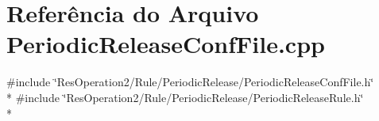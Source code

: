 \section{Referência do Arquivo Periodic\+Release\+Conf\+File.\+cpp}
\label{_periodic_release_conf_file_8cpp}
{\ttfamily \#include \char`\"{}Res\+Operation2/\+Rule/\+Periodic\+Release/\+Periodic\+Release\+Conf\+File.\+h\char`\"{}}\\*
{\ttfamily \#include \char`\"{}Res\+Operation2/\+Rule/\+Periodic\+Release/\+Periodic\+Release\+Rule.\+h\char`\"{}}\\*
